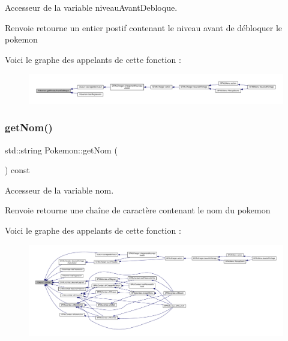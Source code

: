 Accesseur de la variable niveau\+Avant\+Debloque. 

\begin{DoxyReturn}{Renvoie}
retourne un entier postif contenant le niveau avant de débloquer le pokemon 
\end{DoxyReturn}
Voici le graphe des appelants de cette fonction \+:\nopagebreak
\begin{figure}[H]
\begin{center}
\leavevmode
\includegraphics[width=350pt]{class_pokemon_a84a91b991611246fa387ede48e18d357_icgraph}
\end{center}
\end{figure}
\mbox{\label{class_pokemon_aca789a69b00c4e4189571507539bbc30}} 
\subsubsection{\texorpdfstring{get\+Nom()}{getNom()}}
{\footnotesize\ttfamily std\+::string Pokemon\+::get\+Nom (\begin{DoxyParamCaption}{ }\end{DoxyParamCaption}) const}



Accesseur de la variable nom. 

\begin{DoxyReturn}{Renvoie}
retourne une chaîne de caractère contenant le nom du pokemon 
\end{DoxyReturn}
Voici le graphe des appelants de cette fonction \+:\nopagebreak
\begin{figure}[H]
\begin{center}
\leavevmode
\includegraphics[width=350pt]{class_pokemon_aca789a69b00c4e4189571507539bbc30_icgraph}
\end{center}
\end{figure}
\mbox{\label{class_pokemon_a97e2f2b4b811d5e2bbcb038fb70f57ce}} 
